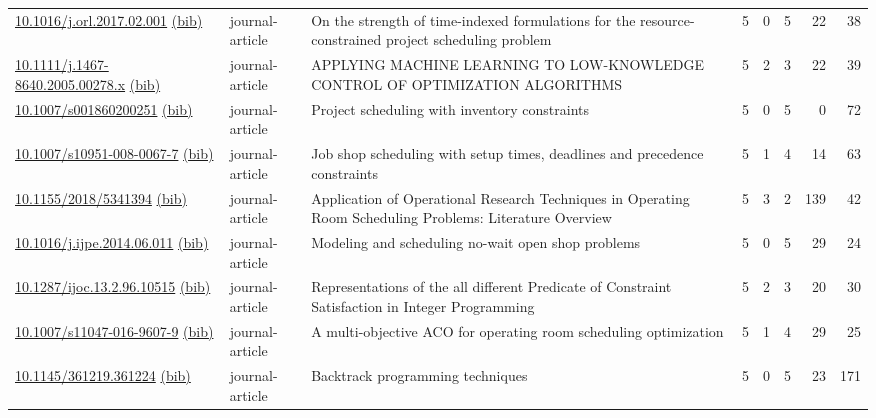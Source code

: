 {\begin{longtable}{p{5cm}lp{11cm}rrrrr}
\href{http://dx.doi.org/10.1016/j.orl.2017.02.001}{10.1016/j.orl.2017.02.001} \href{https://www.doi2bib.org/bib/10.1016/j.orl.2017.02.001}{(bib)} & journal-article & On the strength of time-indexed formulations for the resource-constrained project scheduling problem & 5 & 0 & 5 & 22 & 38 \\
\href{http://dx.doi.org/10.1111/j.1467-8640.2005.00278.x}{10.1111/j.1467-8640.2005.00278.x} \href{https://www.doi2bib.org/bib/10.1111/j.1467-8640.2005.00278.x}{(bib)} & journal-article & APPLYING MACHINE LEARNING TO LOW-KNOWLEDGE CONTROL OF OPTIMIZATION ALGORITHMS & 5 & 2 & 3 & 22 & 39 \\
\href{http://dx.doi.org/10.1007/s001860200251}{10.1007/s001860200251} \href{https://www.doi2bib.org/bib/10.1007/s001860200251}{(bib)} & journal-article & Project scheduling with inventory constraints & 5 & 0 & 5 & 0 & 72 \\
\href{http://dx.doi.org/10.1007/s10951-008-0067-7}{10.1007/s10951-008-0067-7} \href{https://www.doi2bib.org/bib/10.1007/s10951-008-0067-7}{(bib)} & journal-article & Job shop scheduling with setup times, deadlines and precedence constraints & 5 & 1 & 4 & 14 & 63 \\
\href{http://dx.doi.org/10.1155/2018/5341394}{10.1155/2018/5341394} \href{https://www.doi2bib.org/bib/10.1155/2018/5341394}{(bib)} & journal-article & Application of Operational Research Techniques in Operating Room Scheduling Problems: Literature Overview & 5 & 3 & 2 & 139 & 42 \\
\href{http://dx.doi.org/10.1016/j.ijpe.2014.06.011}{10.1016/j.ijpe.2014.06.011} \href{https://www.doi2bib.org/bib/10.1016/j.ijpe.2014.06.011}{(bib)} & journal-article & Modeling and scheduling no-wait open shop problems & 5 & 0 & 5 & 29 & 24 \\
\href{http://dx.doi.org/10.1287/ijoc.13.2.96.10515}{10.1287/ijoc.13.2.96.10515} \href{https://www.doi2bib.org/bib/10.1287/ijoc.13.2.96.10515}{(bib)} & journal-article & Representations of the all different Predicate of Constraint Satisfaction in Integer Programming & 5 & 2 & 3 & 20 & 30 \\
\href{http://dx.doi.org/10.1007/s11047-016-9607-9}{10.1007/s11047-016-9607-9} \href{https://www.doi2bib.org/bib/10.1007/s11047-016-9607-9}{(bib)} & journal-article & A multi-objective ACO for operating room scheduling optimization & 5 & 1 & 4 & 29 & 25 \\
\href{http://dx.doi.org/10.1145/361219.361224}{10.1145/361219.361224} \href{https://www.doi2bib.org/bib/10.1145/361219.361224}{(bib)} & journal-article & Backtrack programming techniques & 5 & 0 & 5 & 23 & 171 \\

\end{longtable}}
